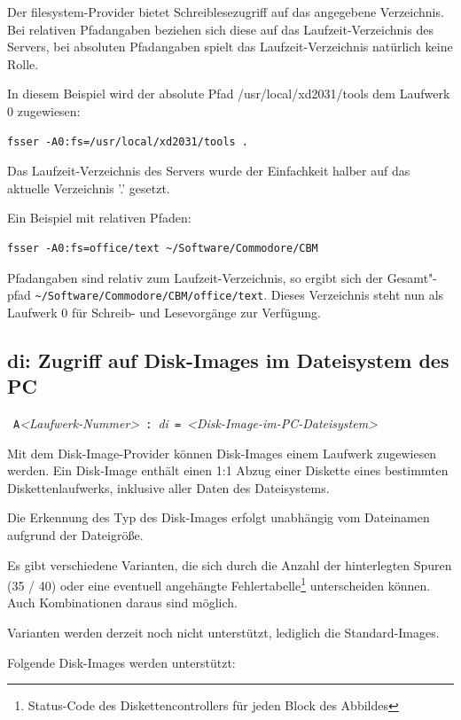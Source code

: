 \documentclass[10pt,a4paper]{scrartcl}		%
\begin{document}
Der filesystem-Provider bietet Schreiblesezugriff auf das
angegebene Verzeichnis. Bei relativen Pfadangaben beziehen sich diese
auf das Laufzeit-Verzeichnis des Servers, bei absoluten Pfadangaben
spielt das Laufzeit-Verzeichnis natürlich keine Rolle.

In diesem Beispiel wird der absolute Pfad /usr/local/xd2031/tools
dem Laufwerk 0 zugewiesen:

\begin{verbatim}
fsser -A0:fs=/usr/local/xd2031/tools .
\end{verbatim}

Das Laufzeit-Verzeichnis des Servers wurde der Einfachkeit halber
auf das aktuelle Verzeichnis '.' gesetzt.

Ein Beispiel mit relativen Pfaden:

\begin{verbatim}
fsser -A0:fs=office/text ~/Software/Commodore/CBM
\end{verbatim}

Pfadangaben sind relativ zum Laufzeit-Verzeichnis, 
so ergibt sich der Gesamt"-pfad  
\texttt{\~{}/Software/Commodore/CBM/office/text}.
Dieses Verzeichnis steht nun als Laufwerk 0 
für Schreib- und Lesevorgänge zur Verfügung.

\subsection{di: Zugriff auf Disk-Images im Dateisystem des PC}
\mbox{ \texttt{A}\textit{<Laufwerk-Nummer>} 
\texttt{:} \textit{di} \texttt{=}
\textit{<Disk-Image-im-PC-Dateisystem>} }

Mit dem Disk-Image-Provider können Disk-Images einem
Laufwerk zugewiesen werden. Ein Disk-Image enthält einen 1:1 Abzug
einer Diskette eines bestimmten Diskettenlaufwerks, inklusive
aller Daten des Dateisystems.

Die Erkennung des Typ des Disk-Images erfolgt unabhängig vom 
Dateinamen aufgrund der Dateigröße. 

Es gibt verschiedene Varianten, die sich durch die Anzahl
der hinterlegten Spuren (35 / 40) oder eine eventuell 
angehängte 
Fehlertabelle\footnote{Status-Code des Diskettencontrollers für 
jeden Block des Abbildes} 
unterscheiden können. Auch Kombinationen daraus sind möglich.

Varianten werden derzeit noch nicht unterstützt, lediglich die
Standard-Images.

Folgende Disk-Images werden unterstützt:
\end{document}
